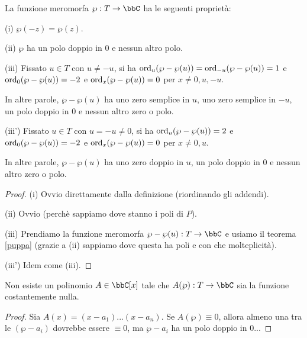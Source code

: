 \begin{proposizione}
La funzione meromorfa $\wp:T\rar\bbC$ ha le seguenti proprietà:

(i) $\wp(-z)=\wp(z)$.

(ii) $\wp$ ha un polo doppio in $0$ e nessun altro polo.

(iii) Fissato $u\in T$ con $u\not=-u$, si ha $\text{ord}_u(\wp-\wp(u))=\text{ord}_{-u}(\wp-\wp(u))=1$ e $\text{ord}_0(\wp-\wp(u))=-2$ e $\text{ord}_x(\wp-\wp(u))=0$ per $x\not=0,u,-u$.

In altre parole, $\wp-\wp(u)$ ha uno zero semplice in $u$, uno zero semplice in $-u$, un polo doppio in $0$ e nessun altro zero o polo.

(iii') Fissato $u\in T$ con $u=-u\not=0$, si ha $\text{ord}_u(\wp-\wp(u))=2$ e $\text{ord}_0(\wp-\wp(u))=-2$ e $\text{ord}_x(\wp-\wp(u))=0$ per $x\not=0,u$.

In altre parole, $\wp-\wp(u)$ ha uno zero doppio in $u$, un polo doppio in $0$ e nessun altro zero o polo.
\end{proposizione}
\begin{proof}
(i) Ovvio direttamente dalla definizione (riordinando gli addendi).

(ii) Ovvio (perchè sappiamo dove stanno i poli di $P$).

(iii) Prendiamo la funzione meromorfa $\wp-\wp(u):T\rar\bbC$ e usiamo il teorema \ref{puppa} (grazie a (ii) sappiamo dove questa ha poli e con che molteplicità).

(iii') Idem come (iii).
\end{proof}


\begin{teorema}
Non esiste un polinomio $A\in\bbC[x]$ tale che $A(\wp):T\rar\bbC$ sia la funzione costantemente nulla.
\end{teorema}
\begin{proof}
Sia $A(x)=(x-a_1)...(x-a_n)$. Se $A(\wp)\equiv0$, allora almeno una tra le $(\wp-a_i)$ dovrebbe essere $\equiv0$, ma $\wp-a_i$ ha un polo doppio in $0$...
\end{proof}


